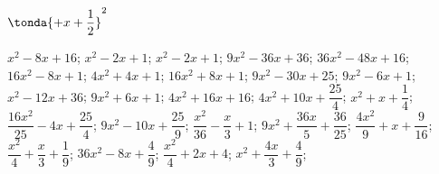 \begin{esercizio}
\begin{htmulticols}{4}
\begin{enumeratea}
\item \(\tonda{+ x + \dfrac{1}{2}}^{2}\) %
\end{enumeratea}
\end{htmulticols}
\noindent\! \(x^{2} - 8 x + 16\); \quad 
{} \(x^{2} - 2 x + 1\); \quad 
{} \(x^{2} - 2 x + 1\); \quad 
{} \(9 x^{2} - 36 x + 36\); \quad 
{} \(36 x^{2} - 48 x + 16\); \quad 
{} \(16 x^{2} - 8 x + 1\); \quad 
{} \(4 x^{2} + 4 x + 1\); \quad 
{} \(16 x^{2} + 8 x + 1\); \quad 
{} \(9 x^{2} - 30 x + 25\); \quad 
{} \(9 x^{2} - 6 x + 1\); \quad 
{} \(x^{2} - 12 x + 36\); \quad 
{} \(9 x^{2} + 6 x + 1\); \quad 
{} \(4 x^{2} + 16 x + 16\); \quad 
{} \(4 x^{2} + 10 x + \dfrac{25}{4}\); \quad 
{} \(x^{2} + x + \dfrac{1}{4}\); \quad %
 \(\dfrac{16 x^{2}}{25} - 4 x + \dfrac{25}{4}\); \quad 
{} \(9 x^{2} - 10 x + \dfrac{25}{9}\); \quad 
{} \(\dfrac{x^{2}}{36} - \dfrac{x}{3} + 1\); \quad 
{} \(9 x^{2} + \dfrac{36 x}{5} + \dfrac{36}{25}\); \quad 
{} \(\dfrac{4 x^{2}}{9} + x + \dfrac{9}{16}\); \quad 
{} \(\dfrac{x^{2}}{4} + \dfrac{x}{3} + \dfrac{1}{9}\); \quad 
{} \(36 x^{2} - 8 x + \dfrac{4}{9}\); \quad 
{} \(\dfrac{x^{2}}{4} + 2 x + 4\); \quad 
{} \(x^{2} + \dfrac{4 x}{3} + \dfrac{4}{9}\); \quad 
\end{esercizio}

